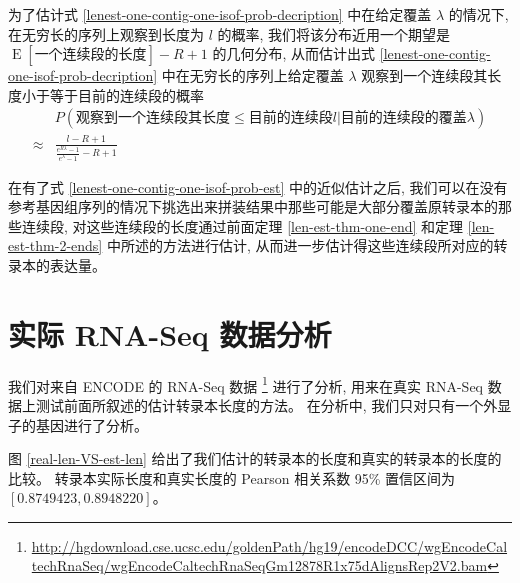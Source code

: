 为了估计式 \eqref{lenest-one-contig-one-isof-prob-decription} 
中在给定覆盖 $\lambda$ 的情况下, 在无穷长的序列上观察到长度为 $l$ 的概率, 
我们将该分布近用一个期望是 $\operatorname{E}[\text{一个连续段的长度}] -R+1$ 的几何分布, 
从而估计出式 \ref{lenest-one-contig-one-isof-prob-decription} 
中在无穷长的序列上给定覆盖 $\lambda$ 观察到一个连续段其长度小于等于目前的连续段的概率
\begin{align}
\label{lenest-one-contig-one-isof-prob-est}
& P(\text{观察到一个连续段其长度} \leq \text{目前的连续段} l |\text{目前的连续段的覆盖} \lambda) \nonumber \\
\approx & \frac{l-R+1}{\frac{e^{R\lambda} -1}{e^{\lambda}-1} -R+1}
\end{align}

在有了式 \eqref{lenest-one-contig-one-isof-prob-est} 中的近似估计之后, 
我们可以在没有参考基因组序列的情况下挑选出来拼装结果中那些可能是大部分覆盖原转录本的那些连续段, 
对这些连续段的长度通过前面定理 \ref{len-est-thm-one-end} 和定理 
\ref{len-est-thm-2-ends} 中所述的方法进行估计, 
从而进一步估计得这些连续段所对应的转录本的表达量。 


\section{实际 RNA-Seq 数据分析}
\label{len-est-real-rna-seq}

我们对来自 ENCODE \cite{encode} 的 RNA-Seq 数据 
\footnote{\url{http://hgdownload.cse.ucsc.edu/goldenPath/hg19/encodeDCC/wgEncodeCaltechRnaSeq/wgEncodeCaltechRnaSeqGm12878R1x75dAlignsRep2V2.bam}} 
进行了分析, 
用来在真实 RNA-Seq 数据上测试前面所叙述的估计转录本长度的方法。 
在分析中, 我们只对只有一个外显子的基因进行了分析。

图 \ref{real-len-VS-est-len} 给出了我们估计的转录本的长度和真实的转录本的长度的比较。
转录本实际长度和真实长度的 Pearson 相关系数 95\% 置信区间为 $[0.8749423, 0.8948220]$。 

